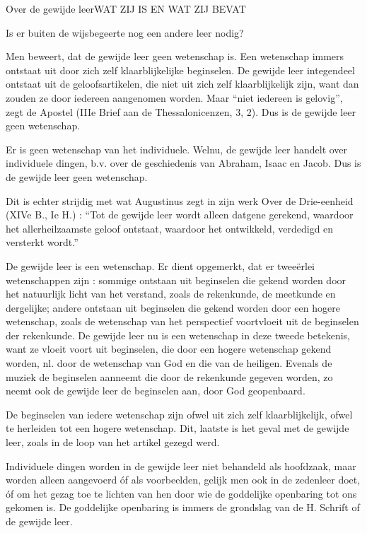 \documentclass{summa}
\begin{document}
\begin{quaestio}{Over de gewijde leer}{WAT ZIJ IS EN WAT ZIJ BEVAT}
  \begin{articulus}{Is er buiten de wijsbegeerte nog een andere leer nodig?}
    \begin{objectiones}
    \item { Men beweert, dat de gewijde leer geen wetenschap is. Een wetenschap immers ontstaat uit door zich zelf klaarblijkelijke beginselen. De gewijde leer integendeel ontstaat uit de geloofsartikelen, die niet uit zich zelf klaarblijkelijk zijn, want dan zouden ze door iedereen aangenomen worden. Maar “niet iedereen is gelovig”, zegt de Apostel (IIIe Brief aan de Thessalonicenzen, 3, 2). Dus is de gewijde leer geen wetenschap. }
    \item { Er is geen wetenschap van het individuele. Welnu, de gewijde leer handelt over individuele dingen, b.v. over de geschiedenis van Abraham, Isaac en Jacob. Dus is de gewijde leer geen wetenschap. }
    \end{objectiones}
    
    
    \begin {contra}
      Dit is echter strijdig met wat Augustinus zegt in zijn werk Over de Drie-eenheid (XIVe B., Ie H.) : “Tot de gewijde leer wordt alleen datgene gerekend, waardoor het allerheilzaamste geloof ontstaat, waardoor het ontwikkeld, verdedigd en versterkt wordt.”
    \end {contra}
    
    \begin {respondeo}
      De gewijde leer is een wetenschap. Er dient opgemerkt, dat er tweeërlei wetenschappen zijn : sommige ontstaan uit beginselen die gekend worden door het natuurlijk licht van het verstand, zoals de rekenkunde, de meetkunde en dergelijke; andere ontstaan uit beginselen die gekend worden door een hogere wetenschap, zoals de wetenschap van het perspectief voortvloeit uit de beginselen der rekenkunde. De gewijde leer nu is een wetenschap in deze tweede betekenis, want ze vloeit voort uit beginselen, die door een hogere wetenschap gekend worden, nl. door de wetenschap van God en die van de heiligen. Evenals de muziek de beginselen aanneemt die door de rekenkunde gegeven worden, zo neemt ook de gewijde leer de beginselen aan, door God geopenbaard.
    \end {respondeo}
    
    \begin{responsiones}
    \item { De beginselen van iedere wetenschap zijn ofwel uit zich zelf klaarblijkelijk, ofwel te herleiden tot een hogere wetenschap. Dit, laatste is het geval met de gewijde leer, zoals in de loop van het artikel gezegd werd. }
    \item { Individuele dingen worden in de gewijde leer niet behandeld als hoofdzaak, maar worden alleen aangevoerd óf als voorbeelden, gelijk men ook in de zedenleer doet, óf om het gezag toe te lichten van hen door wie de goddelijke openbaring tot ons gekomen is. De goddelijke openbaring is immers de grondslag van de H. Schrift of de gewijde leer. }
    \end{responsiones}
  \end{articulus}
\end{quaestio}
\end{document}
